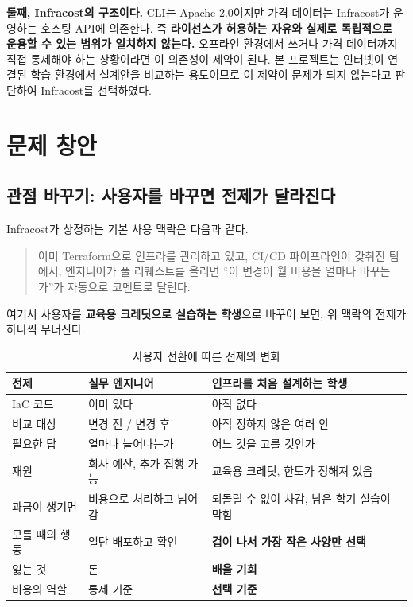 \documentclass[10pt,a4paper]{article}
\begin{document}
\textbf{둘째, Infracost의 구조이다.} CLI는 Apache-2.0이지만 가격 데이터는 Infracost가 운영하는 호스팅 API에 의존한다. 즉 \textbf{라이선스가 허용하는 자유와 실제로 독립적으로 운용할 수 있는 범위가 일치하지 않는다.} 오프라인 환경에서 쓰거나 가격 데이터까지 직접 통제해야 하는 상황이라면 이 의존성이 제약이 된다. 본 프로젝트는 인터넷이 연결된 학습 환경에서 설계안을 비교하는 용도이므로 이 제약이 문제가 되지 않는다고 판단하여 Infracost를 선택하였다.

\section{문제 창안}

\subsection{관점 바꾸기: 사용자를 바꾸면 전제가 달라진다}

Infracost가 상정하는 기본 사용 맥락은 다음과 같다.

\begin{quote}
이미 Terraform으로 인프라를 관리하고 있고, CI/CD 파이프라인이 갖춰진 팀에서, 엔지니어가 풀 리퀘스트를 올리면 ``이 변경이 월 비용을 얼마나 바꾸는가''가 자동으로 코멘트로 달린다.
\end{quote}

여기서 사용자를 \textbf{교육용 크레딧으로 실습하는 학생}으로 바꾸어 보면, 위 맥락의 전제가 하나씩 무너진다.

\begin{table}[!h]
\centering
\caption{사용자 전환에 따른 전제의 변화}
\label{tab:premise}
\footnotesize
\begin{tabularx}{\textwidth}{l Y Y}
\toprule
\textbf{전제} & \textbf{실무 엔지니어} & \textbf{인프라를 처음 설계하는 학생} \\
\midrule
IaC 코드      & 이미 있다 & 아직 없다 \\
비교 대상     & 변경 전 / 변경 후 & 아직 정하지 않은 여러 안 \\
필요한 답     & 얼마나 늘어나는가 & 어느 것을 고를 것인가 \\
재원          & 회사 예산, 추가 집행 가능 & 교육용 크레딧, 한도가 정해져 있음 \\
과금이 생기면 & 비용으로 처리하고 넘어감 & 되돌릴 수 없이 차감, 남은 학기 실습이 막힘 \\
모를 때의 행동 & 일단 배포하고 확인 & \textbf{겁이 나서 가장 작은 사양만 선택} \\
잃는 것       & 돈 & \textbf{배울 기회} \\
비용의 역할   & 통제 기준 & \textbf{선택 기준} \\
\bottomrule
\end{tabularx}
\end{table}
\end{document}
